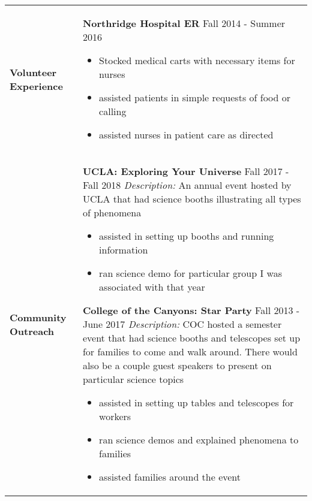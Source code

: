 \documentclass[10pt]{article}
\newcommand*\leftright[2]{%
  \leavevmode
  \rlap{#1}%
  \hspace{0.5\linewidth}%
  #2}
\begin{document}
\begin{longtable}{l l l l}
    \multicolumn{1}{p{2cm}}{\textbf{Volunteer \newline Experience}}     &
        \multicolumn{3}{p{16cm}}{
        \textbf{Northridge Hospital ER} \newline
        \leftright{\textit{ER Volunteer}}{Fall 2014 - Summer 2016}
        \begin{itemize}[noitemsep,nolistsep]
            \item Stocked medical carts with necessary items for nurses
            \item assisted patients in simple requests of food or calling
            \item assisted nurses in patient care as directed
        \end{itemize}
        \baselineskip} \\ 
    \multicolumn{1}{p{2cm}}{\textbf{Community \newline Outreach}}       &
        \multicolumn{3}{p{16cm}}{
        \textbf{UCLA: Exploring Your Universe} \newline
        \leftright{\textit{Booth Volunteer}}{Fall 2017 - Fall 2018} \newline
        \textit{Description:} An annual event hosted by UCLA that had science booths illustrating all types of phenomena
        \begin{itemize}[noitemsep,nolistsep]
            \item assisted in setting up booths and running information
            \item ran science demo for particular group I was associated with that year
        \end{itemize}
        
        \textbf{College of the Canyons: Star Party} \newline
        \leftright{\textit{Booth Volunteer}}{Fall 2013 - June 2017} \newline
        \textit{Description:} COC hosted a semester event that had science booths and telescopes set up for families to come and walk around. There would also be a couple guest speakers to present on particular science topics
        \begin{itemize}[noitemsep,nolistsep]
            \item assisted in setting up tables and telescopes for workers
            \item ran science demos and explained phenomena to families
            \item assisted families around the event
        \end{itemize}
        
        }
\end{longtable}
\end{document}

